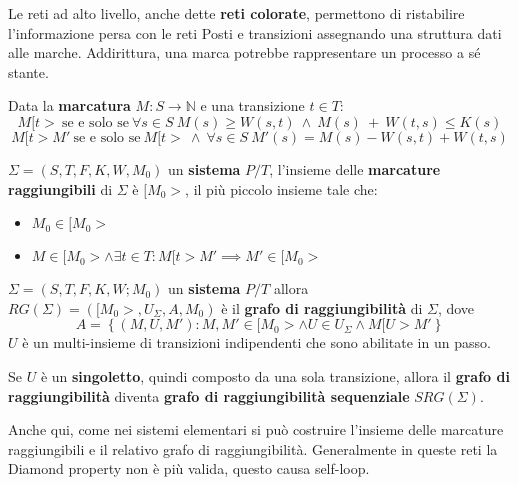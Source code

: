 Le reti ad alto livello, anche dette \textbf{reti colorate}, permettono di
ristabilire l'informazione persa con le reti Posti e transizioni assegnando una
struttura dati alle marche. Addirittura, una marca potrebbe rappresentare un
processo a sé stante.
\begin{definizione} 
    Data la \textbf{marcatura} $M:S\to \mathbb{N}$ e una transizione $t\in T$:
    \begin{equation}
        M[t > \ \text{se e solo se} \ \forall s \in S \ M(s) \geq W(s, t) \ \land
        \ M(s) \ + \ W(t, s) \leq K(s)
    \end{equation}
    \begin{equation}
        M[t > M' \ \text{se e solo se} \ M[t > \ \land \ \forall s \in S \ M'(s)
        = M(s) - W(s, t) + W(t, s)
    \end{equation}
\end{definizione}
\begin{definizione}
    $\Sigma = (S,T,F,K,W,M_0)$ un \textbf{sistema} $P/T$, l'insieme delle
    \textbf{marcature raggiungibili} di $\Sigma$ è $[M_0>$, il più piccolo
    insieme tale che:
    \begin{itemize}
        \item $M_0\in [M_0>$
        \item $M\in [M_0>\land \exists t\in T: M[t>M'\implies M' \in [M_0>$
    \end{itemize}
\end{definizione}
\begin{definizione}
    $\Sigma = (S,T,F,K,W;M_0)$ un \textbf{sistema} $P/T$ allora
    $RG(\Sigma)=([M_0>,U_\Sigma,A,M_0)$ è il \textbf{grafo di raggiungibilità}
    di $\Sigma$, dove
    \begin{equation}
        A=\left\{(M,U,M'):M,M'\in [M_0>\land U\in U_\Sigma\land M[U>M' \right\}
    \end{equation}
    $U$ è un multi-insieme di transizioni indipendenti che sono abilitate in un passo.
\end{definizione}
\begin{nota}
    Se $U$ è un \textbf{singoletto}, quindi composto da una sola transizione, allora
    il \textbf{grafo di raggiungibilità} diventa \textbf{grafo di raggiungibilità sequenziale}
    $SRG(\Sigma)$.
\end{nota}
Anche qui, come nei sistemi elementari si può costruire l'insieme delle marcature
raggiungibili e il relativo grafo di raggiungibilità. Generalmente in queste reti
la Diamond property non è più valida, questo causa self-loop.

